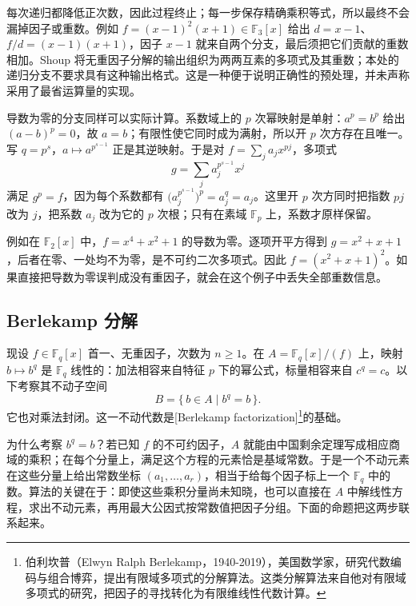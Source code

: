 每次递归都降低正次数，因此过程终止；每一步保存精确乘积等式，所以最终不会漏掉因子或重数。例如 \(f=(x-1)^2(x+1)\in\mathbb F_3[x]\) 给出 \(d=x-1\)、\(f/d=(x-1)(x+1)\)，因子 \(x-1\) 就来自两个分支，最后须把它们贡献的重数相加。Shoup 将无重因子分解的输出组织为两两互素的多项式及其重数\cite[Section 20.3]{Shoup2008NumberTheoryAlgebra}；本处的递归分支不要求具有这种输出格式。这是一种便于说明正确性的预处理，并未声称采用了最省运算量的实现。

\ProseParagraphBreak
导数为零的分支同样可以实际计算。系数域上的 \(p\) 次幂映射是单射：\(a^p=b^p\) 给出 \((a-b)^p=0\)，故 \(a=b\)；有限性使它同时成为满射，所以开 \(p\) 次方存在且唯一。写 \(q=p^s\)，\(a\mapsto a^{p^{s-1}}\) 正是其逆映射。于是对 \(f=\sum_j a_jx^{pj}\)，多项式
\[
	g=\sum_j a_j^{p^{s-1}}x^j
\]
满足 \(g^p=f\)，因为每个系数都有 \(\bigl(a_j^{p^{s-1}}\bigr)^p=a_j^q=a_j\)。这里开 \(p\) 次方同时把指数 \(pj\) 改为 \(j\)，把系数 \(a_j\) 改为它的 \(p\) 次根；只有在素域 \(\mathbb F_p\) 上，系数才原样保留。

\ProseParagraphBreak
例如在 \(\mathbb F_2[x]\) 中，\(f=x^4+x^2+1\) 的导数为零。逐项开平方得到 \(g=x^2+x+1\)，后者在零、一处均不为零，是不可约二次多项式。因此 \(f=(x^2+x+1)^2\)。如果直接把导数为零误判成没有重因子，就会在这个例子中丢失全部重数信息。

\subsection{Berlekamp 分解}
\label{b1:subsec:B01:03}

现设 \(f\in\mathbb F_q[x]\) 首一、无重因子，次数为 \(n\geq1\)。在 \(A=\mathbb F_q[x]/(f)\) 上，映射 \(b\mapsto b^q\) 是 \(\mathbb F_q\) 线性的：加法相容来自特征 \(p\) 下的幂公式，标量相容来自 \(c^q=c\)。以下考察其不动子空间
\[
	B=\{\,b\in A\mid b^q=b\,\}.
\]
它也对乘法封闭。这一不动代数是[Berlekamp factorization]\footnote{伯利坎普（Elwyn Ralph Berlekamp，1940-2019），美国数学家，研究代数编码与组合博弈，提出有限域多项式的分解算法。这类分解算法来自他对有限域多项式的研究，把因子的寻找转化为有限维线性代数计算。}的基础。

\ProseParagraphBreak
为什么考察 \(b^q=b\)？若已知 \(f\) 的不可约因子，\(A\) 就能由中国剩余定理写成相应商域的乘积；在每个分量上，满足这个方程的元素恰是基域常数。于是一个不动元素在这些分量上给出常数坐标 \((a_1,\ldots,a_r)\)，相当于给每个因子标上一个 \(\mathbb F_q\) 中的数。算法的关键在于：即使这些乘积分量尚未知晓，也可以直接在 \(A\) 中解线性方程，求出不动元素，再用最大公因式按常数值把因子分组。下面的命题把这两步联系起来。

